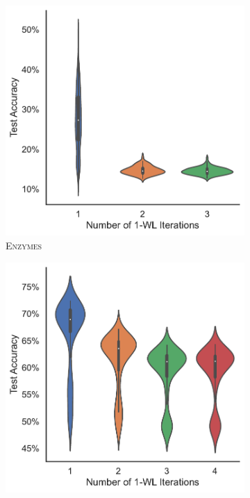\begin{figure}[!htb]
	\centering
	\begin{subfigure}[b]{0.19\textwidth}
		\centering
		\includegraphics[width=\textwidth]{Figures/k_wl_violin_ENZYMES.pdf}
        \caption{\scriptsize\textsc{Enzymes}}
	\end{subfigure}
	\hfill
	\begin{subfigure}[b]{0.19\textwidth}
		\centering
		\includegraphics[width=\textwidth]{Figures/k_wl_violin_IMDB-BINARY.pdf}

\end{subfigure}
\end{figure}
